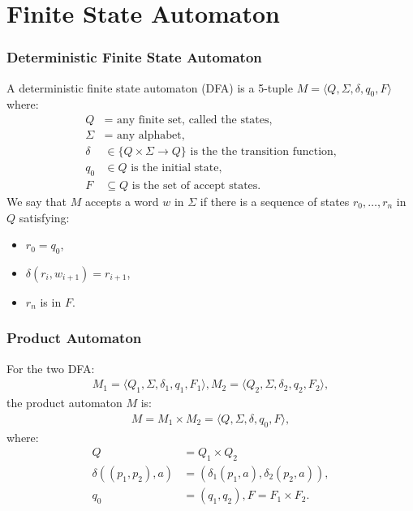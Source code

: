 \section{Finite State Automaton}

\subsubsection{Deterministic Finite State Automaton}

A deterministic finite state automaton (DFA) is a 5-tuple 
$M = \langle Q, \Sigma, \delta, q_0, F \rangle$
where: \begin{align*}
    Q      &= \text{ any finite set, called the states,} \\
    \Sigma &= \text{ any alphabet,} \\ 
    \delta &\in \{ Q \times \Sigma \to Q \} \text{ is the the transition function,} \\
    q_0    &\in Q \text{ is the initial state,} \\
    F      &\subseteq Q \text{ is the set of accept states.}
\end{align*} We say that $M$ accepts a word $w$ in $\Sigma$
if there is a sequence of states $r_0, \ldots, r_n$ in $Q$
satisfying: \begin{itemize}
    \item $r_0 = q_0$,
    \item $\delta(r_i, w_{i + 1}) = r_{i + 1}$,
    \item $r_n$ is in $F$.
\end{itemize}

\subsubsection{Product Automaton}

For the two DFA: \begin{align*}
    M_1 = \langle Q_1, \Sigma, \delta_1, q_1, F_1 \rangle,
    M_2 = \langle Q_2, \Sigma, \delta_2, q_2, F_2 \rangle,
\end{align*} the product automaton $M$ is: \begin{gather*}
    M = M_1 \times M_2 = \langle Q, \Sigma, \delta, q_0, F \rangle,
\end{gather*} where: \begin{align*}
    Q &= Q_1 \times Q_2 \\
    \delta((p_1, p_2), a) &= (\delta_1(p_1, a), \delta_2(p_2, a)), \\
    q_0 &= (q_1, q_2),
    F = F_1 \times F_2.
\end{align*}

